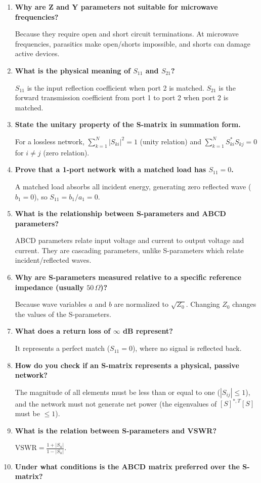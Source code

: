 \documentclass[12pt,a4paper]{article}
\newcommand{\Q}[1]{\textbf{#1}\par\noindent\ignorespaces}
\begin{document}
\begin{tcolorbox}[exambox, title={\textbf{Frequently Asked / Viva Questions}}]
\begin{enumerate}[topsep=0pt, label=\textbf{Q\arabic*.}, itemsep=5pt]
  \item \Q{Why are Z and Y parameters not suitable for microwave frequencies?}
    Because they require open and short circuit terminations. At microwave frequencies, parasitics make open/shorts impossible, and shorts can damage active devices.
  \item \Q{What is the physical meaning of $S_{11}$ and $S_{21}$?}
    $S_{11}$ is the input reflection coefficient when port 2 is matched. $S_{21}$ is the forward transmission coefficient from port 1 to port 2 when port 2 is matched.
  \item \Q{State the unitary property of the S-matrix in summation form.}
    For a lossless network, $\sum_{k=1}^N |S_{ki}|^2 = 1$ (unity relation) and $\sum_{k=1}^N S_{ki}^* S_{kj} = 0$ for $i \ne j$ (zero relation).
  \item \Q{Prove that a 1-port network with a matched load has $S_{11} = 0$.}
    A matched load absorbs all incident energy, generating zero reflected wave ($b_1 = 0$), so $S_{11} = b_1/a_1 = 0$.
  \item \Q{What is the relationship between S-parameters and ABCD parameters?}
    ABCD parameters relate input voltage and current to output voltage and current. They are cascading parameters, unlike S-parameters which relate incident/reflected waves.
  \item \Q{Why are S-parameters measured relative to a specific reference impedance (usually $50\,\Omega$)?}
    Because wave variables $a$ and $b$ are normalized to $\sqrt{Z_0}$. Changing $Z_0$ changes the values of the S-parameters.
  \item \Q{What does a return loss of $\infty$ dB represent?}
    It represents a perfect match ($S_{11} = 0$), where no signal is reflected back.
  \item \Q{How do you check if an S-matrix represents a physical, passive network?}
    The magnitude of all elements must be less than or equal to one ($|S_{ij}| \le 1$), and the network must not generate net power (the eigenvalues of $[S]^{*,T}[S]$ must be $\le 1$).
  \item \Q{What is the relation between S-parameters and VSWR?}
    $\text{VSWR} = \frac{1 + |S_{ii}|}{1 - |S_{ii}|}$.
  \item \Q{Under what conditions is the ABCD matrix preferred over the S-matrix?}

\end{enumerate}
\end{tcolorbox}
\end{document}
